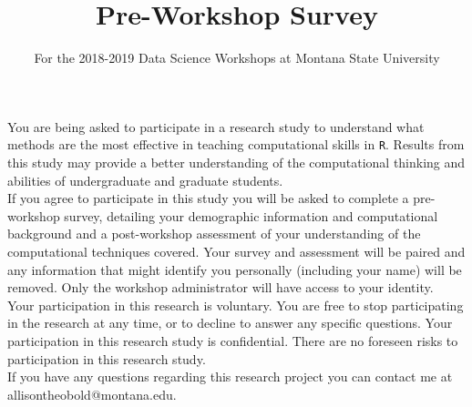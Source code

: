 \documentclass{article}
\title{Pre-Workshop Survey}
\author{For the 2018-2019 Data Science Workshops at Montana State University}
\date{}
\begin{document}
\maketitle

\vspace{0.25cm}

\noindent You are being asked to participate in a research study to understand what methods are the most
effective in teaching computational skills in \texttt{R}. Results from this study may provide a better
understanding of the computational thinking and abilities of undergraduate and graduate students. \\

\noindent If you agree to participate in this study you will be asked to complete a pre-workshop survey, detailing
your demographic information and computational background and a post-workshop assessment of your
understanding of the computational techniques covered. Your survey and assessment will be paired and
any information that might identify you personally (including your name) will be removed. Only the
workshop administrator will have access to your identity. \\

\noindent Your participation in this research is voluntary. You are free to stop participating in the research at any
time, or to decline to answer any specific questions. Your participation in this research study is
confidential. There are no foreseen risks to participation in this research study. \\

\noindent If you have any questions regarding this research project you can contact me at allisontheobold@montana.edu. \\
\end{document}
